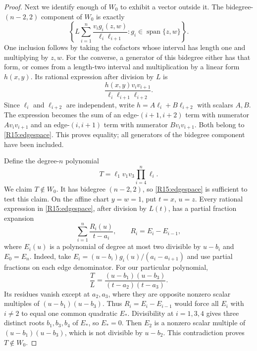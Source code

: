 \begin{proof}
Next we identify enough of $W_0$ to exhibit a vector outside it.
The bidegree-$(n-2,2)$ component of $W_0$ is exactly
\begin{equation}\label{R15:edgespace}
 \left\{
 L\sum_{i=1}^n
 \frac{v_i g_i(z,w)}{\ell_i\ell_{i+1}}:
 g_i\in\operatorname{span}\{z,w\}
 \right\}.
\end{equation}
One inclusion follows by taking the cofactors whose interval has
length one and multiplying by $z,w$.
For the converse, a generator of this bidegree either has that
form, or comes from a length-two interval and multiplication
by a linear form $h(x,y)$.
Its rational expression after division by $L$ is
\[
 \frac{h(x,y)v_i v_{i+1}}{\ell_i\ell_{i+1}\ell_{i+2}}.
\]
Since $\ell_i$ and $\ell_{i+2}$ are independent, write
$h=A\ell_i+B\ell_{i+2}$ with scalars $A,B$.
The expression becomes the sum of an edge-$(i+1,i+2)$ term
with numerator $A v_i v_{i+1}$ and an edge-$(i,i+1)$ term
with numerator $B v_i v_{i+1}$. Both belong to
\eqref{R15:edgespace}. This proves equality; all generators of
the bidegree component have been included.

Define the degree-$n$ polynomial
\[
 T=\ell_1v_1v_3\prod_{i=4}^n\ell_i.
\]
We claim $T\notin W_0$. It has bidegree $(n-2,2)$, so
\eqref{R15:edgespace} is sufficient to test this claim.
On the affine chart $y=w=1$, put $t=x$, $u=z$.
Every rational expression in \eqref{R15:edgespace}, after
division by $L(t)$, has a partial fraction expansion
\[
 \sum_{i=1}^n\frac{R_i(u)}{t-a_i},
 \qquad R_i=E_i-E_{i-1},
\]
where $E_i(u)$ is a polynomial of degree at most two divisible
by $u-b_i$ and $E_0=E_n$. Indeed, take
$E_i=(u-b_i)g_i(u)/(a_i-a_{i+1})$ and use partial fractions
on each edge denominator.
For our particular polynomial,
\[
 \frac{T}{L}
 =\frac{(u-b_1)(u-b_3)}{(t-a_2)(t-a_3)}.
\]
Its residues vanish except at $a_2,a_3$, where they are
opposite nonzero scalar multiples of $(u-b_1)(u-b_3)$.
Thus $R_i=E_i-E_{i-1}$ would force all $E_i$ with $i\ne2$
to equal one common quadratic $E_*$. Divisibility at
$i=1,3,4$ gives three distinct roots $b_1,b_3,b_4$ of $E_*$,
so $E_*=0$.
Then $E_2$ is a nonzero scalar multiple of
$(u-b_1)(u-b_3)$, which is not divisible by $u-b_2$.
This contradiction proves $T\notin W_0$.


\end{proof}
